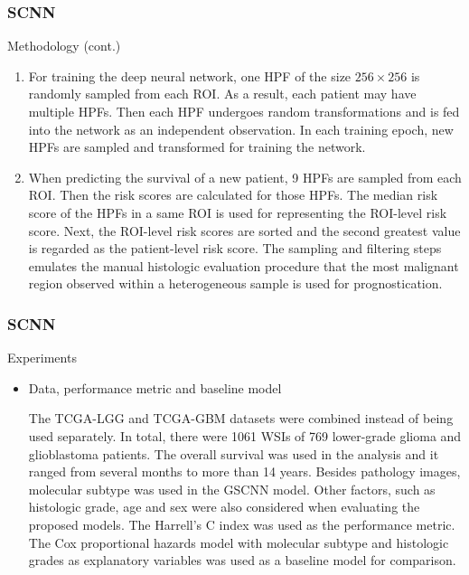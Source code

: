 \documentclass{beamer}
\begin{document}
	\begin{frame}
		\frametitle{SCNN}
		Methodology (cont.)
		\begin{enumerate}[A]
			\item For training the deep neural network, one HPF of the size $256 \times 256$ is randomly sampled from each ROI. As a result, each patient may have multiple HPFs. Then each HPF undergoes random transformations and is fed into the network as an independent observation. In each training epoch, new HPFs are sampled and transformed for training the network.  
			\item When predicting the survival of a new patient, 9 HPFs are sampled from each ROI. Then the risk scores are calculated for those HPFs. The median risk score of the HPFs in a same ROI is used for representing the ROI-level risk score. Next, the ROI-level risk scores are sorted and the second greatest value is regarded as the patient-level risk score. The sampling and filtering steps emulates the manual histologic evaluation procedure that the most malignant region observed within a heterogeneous sample is used for prognostication.
		\end{enumerate}
	\end{frame}
	
	\begin{frame}
		\frametitle{SCNN}
		Experiments
		\begin{itemize}
			\item Data, performance metric and baseline model
			
			The TCGA-LGG and TCGA-GBM datasets were combined instead of being used separately. In total, there were 1061 WSIs of 769 lower-grade glioma and glioblastoma patients. The overall survival was used in the analysis and it ranged from several months to more than 14 years. Besides pathology images, molecular subtype was used in the GSCNN model. Other factors, such as histologic grade, age and sex were also considered when evaluating the proposed models. The Harrell's C index was used as the performance metric. The Cox proportional hazards model with molecular subtype and histologic grades as explanatory variables was used as a baseline model for comparison.
		\end{itemize}
	\end{frame}
	
\end{document}

